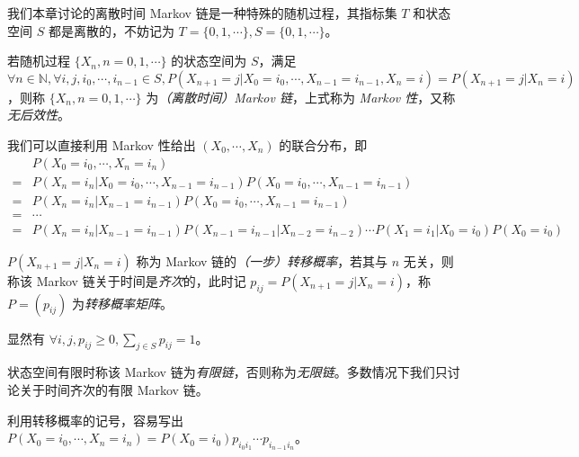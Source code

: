 \documentclass[../main.tex]{subfiles}
\begin{document}
我们本章讨论的离散时间 Markov 链是一种特殊的随机过程，其指标集 $T$ 和状态空间 $S$ 都是离散的，不妨记为 $T=\{0,1,\cdots\},S=\{0,1,\cdots\}$。

\begin{definition}\label{def:7.1.1}
    若随机过程 $\{X_n,n=0,1,\cdots\}$ 的状态空间为 $S$，满足 $\forall n\in\mathbb N,\forall i,j,i_0,\cdots,i_{n-1}\in S,P(X_{n+1}=j|X_0=i_0,\cdots,X_{n-1}=i_{n-1},X_n=i)=P(X_{n+1}=j|X_n=i)$，则称 $\{X_n,n=0,1,\cdots\}$ 为\emph{（离散时间）Markov 链}，上式称为 \emph{Markov 性}，又称\emph{无后效性}。
\end{definition}

我们可以直接利用 Markov 性给出 $(X_0,\cdots,X_n)$ 的联合分布，即
\begin{equation*}
    \begin{aligned}
          & P(X_0=i_0,\cdots,X_n=i_n)                                                                       \\
        = & P(X_n=i_n|X_0=i_0,\cdots,X_{n-1}=i_{n-1})P(X_0=i_0,\cdots,X_{n-1}=i_{n-1})                      \\
        = & P(X_n=i_n|X_{n-1}=i_{n-1})P(X_0=i_0,\cdots,X_{n-1}=i_{n-1})                                     \\
        = & \cdots                                                                                          \\
        = & P(X_n=i_n|X_{n-1}=i_{n-1})P(X_{n-1}=i_{n-1}|X_{n-2}=i_{n-2})\cdots P(X_1=i_1|X_0=i_0)P(X_0=i_0)
    \end{aligned}
\end{equation*}

\begin{definition}\label{def:7.1.2}
    $P(X_{n+1}=j|X_n=i)$ 称为 Markov 链的\emph{（一步）转移概率}，若其与 $n$ 无关，则称该 Markov 链关于时间是\emph{齐次}的，此时记 $p_{ij}=P(X_{n+1}=j|X_n=i)$，称 $P=(p_{ij})$ 为\emph{转移概率矩阵}。
\end{definition}

显然有 $\forall i,j,p_{ij}\geq0,\sum_{j\in S}p_{ij}=1$。

状态空间有限时称该 Markov 链为\emph{有限链}，否则称为\emph{无限链}。多数情况下我们只讨论关于时间齐次的有限 Markov 链。

利用转移概率的记号，容易写出 $P(X_0=i_0,\cdots,X_n=i_n)=P(X_0=i_0)p_{i_0i_1}\cdots p_{i_{n-1}i_n}$。
\end{document}
